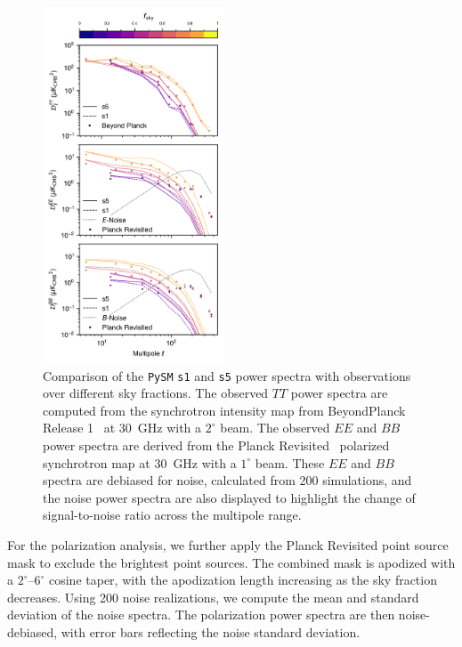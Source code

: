 \documentclass[twocolumn]{aastex631}
\begin{document}
\begin{figure}
   \centering
   \includegraphics[width=0.48\textwidth]{figures/Dlcomp_PySM3-4_s5_vs_BPPR_SYNC.png}
    \caption{Comparison of the \texttt{PySM} \texttt{s1} and \texttt{s5} power spectra with observations over different sky fractions. The observed $TT$ power spectra are computed from the synchrotron intensity map from  BeyondPlanck Release 1~\citep{Andersen:2023} at 30~GHz with a $2^\circ$ beam. The observed $EE$ and $BB$ power spectra are derived from the Planck Revisited~\citep{Delabrouille:2024} polarized synchrotron map at 30~GHz with a $1^\circ$ beam. These $EE$ and $BB$ spectra are debiased for noise, calculated from 200 simulations, and the noise power spectra are also displayed to highlight the change of signal-to-noise ratio across the multipole range.}
   \label{fig:Dl_sync_galmask}
\end{figure}

For the polarization analysis, we further apply the Planck Revisited point source mask to exclude the brightest point sources. The combined mask is apodized with a $2^\circ$--$6^\circ$ cosine taper, with the apodization length increasing as the sky fraction decreases. Using 200 noise realizations, we compute the mean and standard deviation of the noise spectra. The polarization power spectra are then noise-debiased, with error bars reflecting the noise standard deviation.
\end{document}
